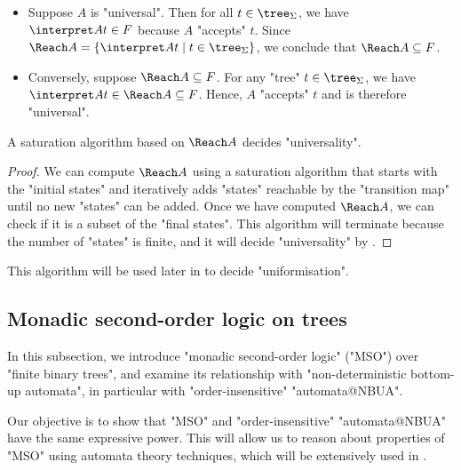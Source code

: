 \documentclass[a4paper,UKenglish,cleveref, autoref, thm-restate]{lipics-v2021}
\begin{document}
\begin{proofI}
	\begin{itemize}
		\item Suppose $A$ is "universal". Then for all $t \in \tree_\Sigma$, we have $\interpret A t \in F$ because $A$ "accepts" $t$.
		      Since $\Reach A = \setdef {\interpret A t} {t \in \tree_\Sigma}$, we conclude that $\Reach A \subseteq F$.

		\item Conversely, suppose $\Reach A \subseteq F$. For any "tree" $t \in \tree_\Sigma$, we have $\interpret A t \in \Reach A \subseteq F$.
		      Hence, $A$ "accepts" $t$ and is therefore "universal".
	\end{itemize}
\end{proofI}

\begin{coro}\label{coro:univeral-Reach}
	A saturation algorithm based on $\Reach A$ decides "universality".
\end{coro}

\begin{proof}
	We can compute $\Reach A$ using a saturation algorithm that starts with the "initial states" and iteratively adds "states" reachable by the "transition map" until no new "states" can be added.
	Once we have computed $\Reach A$, we can check if it is a subset of the "final states". This algorithm will terminate because the number of "states" is finite,
	and it will decide "universality" by .
\end{proof}

This algorithm will be used later in  to decide "uniformisation".

\subsection{Monadic second-order logic on trees}\label{sec:MSO}
In this subsection, we introduce "monadic second-order logic" ("MSO") over "finite binary trees", and examine its relationship with
"non-deterministic bottom-up automata", in particular with "order-insensitive" "automata@NBUA".

Our objective is to show that "MSO" and "order-insensitive" "automata@NBUA" have the same expressive power. This will allow us to reason about properties
of "MSO" using automata theory techniques, which will be extensively used in .
\end{document}
